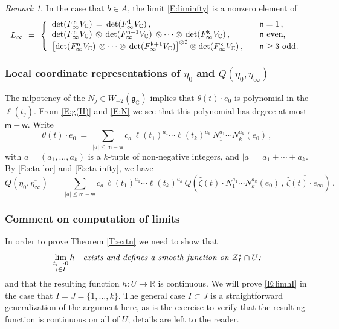 \documentclass[12pt]{amsart}
\numberwithin{equation}{section}
\numberwithin{table}{section}
\def\z{\zeta}
\def\bC{\mathbb{C}}
\def\tdet{\mathrm{det}}
\def\fg{\mathfrak{g}}
\def\sfk{\mathsf{k}}
\def\sfm{\mathsf{m}}
\def\sfn{\mathsf{n}}
\def\bR{\mathbb{R}}
\def\sfw{\mathsf{w}}
\def\ot{\otimes}
\theoremstyle{definition}
\theoremstyle{definition}
\theoremstyle{remark}
\newtheorem{remark}[equation]{Remark}
\begin{document}
\begin{remark} \label{R:whyinfty}
In the case that $b \in A$, the limit \eqref{E:liminfty} is a nonzero element of  
\[
  L_\infty \ = \ 
  \left\{ \begin{array}{ll}
  \tdet(F_\infty^\sfn V_\bC) \,=\, \tdet(F_\infty^1 V_\bC) 
  \,,\quad & \sfn = 1\,,\\
  \tdet(F_\infty^\sfn V_\bC) \,\ot\, 
  \tdet(F_\infty^{\sfn-1} V_\bC) \,\ot\cdots \ot\, 
  \tdet(F_\infty^\sfk V_\bC) \,,\quad & \sfn \hbox{ even,} \\
  \left[\tdet(F_\infty^\sfn V_\bC) \,\ot\cdots \ot\, 
  \tdet(F_\infty^{\sfk+1} V_\bC)\right]^{\ot 2}
  \ot \tdet(F_\infty^\sfk V_\bC) \,,\quad &
  \sfn \ge 3 \hbox{ odd.}
  \end{array}\right.
\]
\end{remark}

\subsubsection{Local coordinate representations of $\eta_0$ and  $Q(\eta_0,\overline{\eta_\infty})$} \label{S:eta0}

The nilpotency of the $N_j \in W_{-2}(\fg_\bC)$ implies that $\theta(t) \cdot e_0$ is polynomial in the $\ell(t_j)$.  From \eqref{E:g(H)} and \eqref{E:N} we see that this polynomial has degree at most $\sfm-\sfw$.  Write
\[
  \theta(t) \cdot e_0 \ = \ 
  \sum_{|a| \le\sfm-\sfw} 
  c_a\,\ell(t_1)^{a_1}\cdots\ell(t_k)^{a_k}\,
  N_1^{a_1}\cdots N_k^{a_k}(e_0) \,,
\]
with $a = (a_1,\ldots,a_k)$ is a $k$-tuple of non-negative integers, and $|a| = a_1+\cdots+a_k$.   By \eqref{E:eta-loc} and \eqref{E:eta-infty}, we have
\[
  Q \left( \eta_0 , \overline{\eta_\infty} \right)
  \ = \ \sum_{|a| \le\sfm-\sfw} 
  c_a\,\ell(t_1)^{a_1}\cdots\ell(t_k)^{a_k}\,
  Q \left( \hat\z(t) \cdot
  N_1^{a_1}\cdots N_k^{a_k}(e_0) \,,\,
  \overline{\hat\z(t) \cdot e_\infty}
  \right) \,.
\]

\subsubsection{Comment on computation of limits} \label{S:limcmt}

In order to prove Theorem \ref{T:extn} we need to show that 
\begin{equation}\label{E:limhI}
  \lim_{\substack{t_i\to0 \\ i\in I}} h \quad
  \hbox{\emph{exists and defines a smooth function on $Z^*_I \cap U$;}}
\end{equation}
and that the resulting function $h : U \to \bR$ is continuous.  We will prove \eqref{E:limhI} in the case that $I = J = \{1,\ldots,k\}$.  The general case $I \subset J$ is a straightforward generalization of the argument here, as is the exercise to verify that the resulting function is continuous on all of $U$; details are left to the reader.
\end{document}
